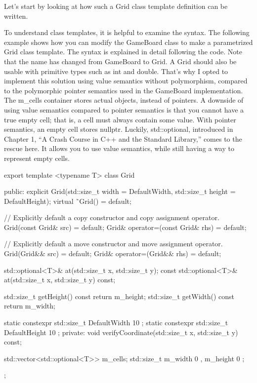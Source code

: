 Let’s start by looking at how such a Grid class template definition can be written.


To understand class templates, it is helpful to examine the syntax. The following example shows how you can modify the GameBoard class to make a parametrized Grid class template. The syntax is explained in detail following the code. Note that the name has changed from GameBoard to Grid. A Grid should also be usable with primitive types such as int and double. That’s why I opted to implement this solution using value semantics without polymorphism, compared to the polymorphic pointer semantics used in the GameBoard implementation. The m\_cells container stores actual objects, instead of pointers. A downside of using value semantics compared to pointer semantics is that you cannot have a true empty cell; that is, a cell must always contain some value. With pointer semantics, an empty cell stores nullptr. Luckily, std::optional, introduced in Chapter 1, “A Crash Course in C++ and the Standard Library,” comes to the rescue here. It allows you to use value semantics, while still having a way to represent empty cells.

\begin{cpp}
export template <typename T>
class Grid
{
    public:
        explicit Grid(std::size_t width = DefaultWidth,
            std::size_t height = DefaultHeight);
        virtual ˜Grid() = default;

        // Explicitly default a copy constructor and copy assignment operator.
        Grid(const Grid& src) = default;
        Grid& operator=(const Grid& rhs) = default;

        // Explicitly default a move constructor and move assignment operator.
        Grid(Grid&& src) = default;
        Grid& operator=(Grid&& rhs) = default;

        std::optional<T>& at(std::size_t x, std::size_t y);
        const std::optional<T>& at(std::size_t x, std::size_t y) const;

        std::size_t getHeight() const { return m_height; }
        std::size_t getWidth() const { return m_width; }

        static constexpr std::size_t DefaultWidth { 10 };
        static constexpr std::size_t DefaultHeight { 10 };
    private:
        void verifyCoordinate(std::size_t x, std::size_t y) const;

        std::vector<std::optional<T>> m_cells;
        std::size_t m_width { 0 }, m_height { 0 };
};
\end{cpp}

